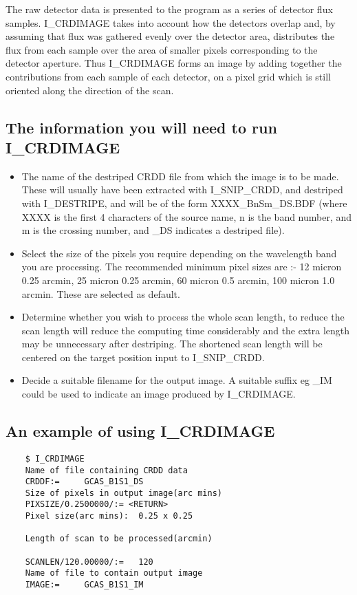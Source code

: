 The raw detector data is presented to the program as a series of detector flux
samples. I\_CRDIMAGE takes into account how the detectors
overlap and, by assuming that flux was gathered evenly over the detector area,
distributes the flux from each sample over the area of smaller pixels
corresponding to the detector aperture. Thus I\_CRDIMAGE forms an image by
adding together the contributions from each sample of each detector, on a pixel
grid which is still oriented along the direction of the scan.

\subsection{The information you will need to run I\_CRDIMAGE}

\begin{itemize}

\item The name of the destriped CRDD file from which the image is to be made.
These will usually have been extracted with I\_SNIP\_CRDD, and destriped with
I\_DESTRIPE, and will be of the form XXXX\_BnSm\_DS.BDF (where XXXX
is the first 4 characters of the source name, n is the band number, and m is
the crossing number, and \_DS indicates a destriped file).

\item Select the size of the pixels you require depending
on the wavelength band you are processing. The recommended minimum pixel sizes
are :- 12 micron  0.25 arcmin, 25 micron  0.25 arcmin, 60 micron   0.5 arcmin,
100 micron  1.0 arcmin. These are selected as default.

\item Determine whether you wish to process the whole scan length, to reduce
the scan length will reduce the computing time considerably and the extra
length may be unnecessary after destriping. The shortened scan length will be
centered on the target position input to I\_SNIP\_CRDD.

\item Decide a suitable filename for the output image. A suitable suffix eg \_IM
could be used to indicate an image produced by I\_CRDIMAGE.
\end {itemize}

\subsection{An example of using I\_CRDIMAGE}

\begin {verbatim}
    $ I_CRDIMAGE
    Name of file containing CRDD data
    CRDDF:=     GCAS_B1S1_DS
    Size of pixels in output image(arc mins)
    PIXSIZE/0.2500000/:= <RETURN>
    Pixel size(arc mins):  0.25 x 0.25

    Length of scan to be processed(arcmin)

    SCANLEN/120.00000/:=   120
    Name of file to contain output image
    IMAGE:=     GCAS_B1S1_IM
\end{verbatim}
\pagebreak

